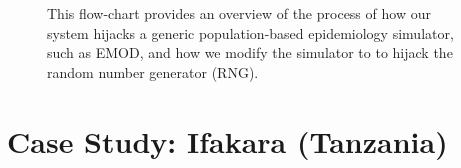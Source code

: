 \documentclass{article}
\newcommand{\bg}[1]{~{{[{\it \textcolor{red}{{\bf BG:} #1}}]}}}
\begin{document}
\begin{figure}
  \label{fig:how}
  \caption{This flow-chart provides an overview of the process of how our system hijacks a generic population-based epidemiology simulator, such as EMOD, and how we modify the simulator to 
  to hijack the random number generator (RNG).}

  \end{figure}



\section{Case Study: Ifakara (Tanzania)}
\label{sec:casestudy}
\end{document}
